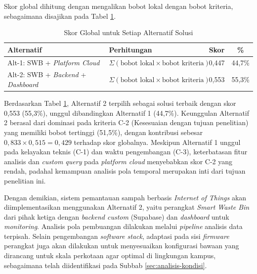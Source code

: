 Skor global dihitung dengan mengalikan bobot lokal dengan bobot kriteria, sebagaimana disajikan pada Tabel \ref{tab:skor-global}.

\begin{table}[H]
  \caption{Skor Global untuk Setiap Alternatif Solusi}
  \label{tab:skor-global}
  \begin{tabularx}{\textwidth}{| X | l | c | c |}
    \hline
    \textbf{Alternatif} & \textbf{Perhitungan} & \textbf{Skor} & \textbf{\%} \\
    \hline
    Alt-1: SWB + \textit{Platform Cloud}       & $\Sigma(\text{bobot lokal} \times \text{bobot kriteria})$ & 0,447 & 44,7\% \\
    \hline
    Alt-2: SWB + \textit{Backend} + \textit{Dashboard} & $\Sigma(\text{bobot lokal} \times \text{bobot kriteria})$ & 0,553 & 55,3\% \\
    \hline
  \end{tabularx}
\end{table}

Berdasarkan Tabel \ref{tab:skor-global}, Alternatif 2 terpilih sebagai solusi terbaik dengan skor 0,553 (55,3\%), unggul dibandingkan Alternatif 1 (44,7\%). Keunggulan Alternatif 2 berasal dari dominasi pada kriteria C-2 (Kesesuaian dengan tujuan penelitian) yang memiliki bobot tertinggi (51,5\%), dengan kontribusi sebesar $0{,}833 \times 0{,}515 = 0{,}429$ terhadap skor globalnya. Meskipun Alternatif 1 unggul pada kelayakan teknis (C-1) dan waktu pengembangan (C-3), keterbatasan fitur analisis dan \textit{custom query} pada \textit{platform cloud} menyebabkan skor C-2 yang rendah, padahal kemampuan analisis pola temporal merupakan inti dari tujuan penelitian ini.

Dengan demikian, sistem pemantauan sampah berbasis \textit{Internet of Things} akan diimplementasikan menggunakan Alternatif 2, yaitu perangkat \textit{Smart Waste Bin} dari pihak ketiga dengan \textit{backend custom} (Supabase) dan \textit{dashboard} untuk \textit{monitoring}. Analisis pola pembuangan dilakukan melalui \textit{pipeline} analisis data terpisah. Selain pengembangan \textit{software stack}, adaptasi pada sisi \textit{firmware} perangkat juga akan dilakukan untuk menyesuaikan konfigurasi bawaan yang dirancang untuk skala perkotaan agar optimal di lingkungan kampus, sebagaimana telah diidentifikasi pada Subbab \ref{sec:analisis-kondisi}.